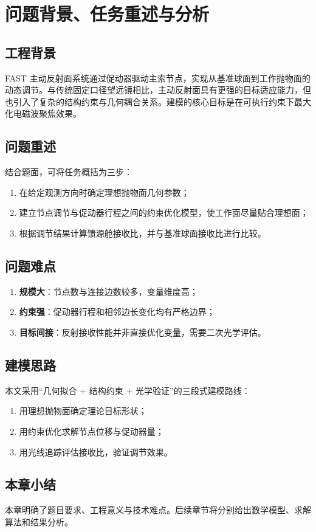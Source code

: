 \chapter{问题背景、任务重述与分析}

\section{工程背景}
FAST 主动反射面系统通过促动器驱动主索节点，实现从基准球面到工作抛物面的动态调节。与传统固定口径望远镜相比，主动反射面具有更强的目标适应能力，但也引入了复杂的结构约束与几何耦合关系。建模的核心目标是在可执行约束下最大化电磁波聚焦效果。

\section{问题重述}
结合题面，可将任务概括为三步：
\begin{enumerate}
  \item 在给定观测方向时确定理想抛物面几何参数；
  \item 建立节点调节与促动器行程之间的约束优化模型，使工作面尽量贴合理想面；
  \item 根据调节结果计算馈源舱接收比，并与基准球面接收比进行比较。
\end{enumerate}

\section{问题难点}
\begin{enumerate}
  \item \textbf{规模大}：节点数与连接边数较多，变量维度高；
  \item \textbf{约束强}：促动器行程和相邻边长变化均有严格边界；
  \item \textbf{目标间接}：反射接收性能并非直接优化变量，需要二次光学评估。
\end{enumerate}

\section{建模思路}
本文采用“几何拟合 + 结构约束 + 光学验证”的三段式建模路线：
\begin{enumerate}
  \item 用理想抛物面确定理论目标形状；
  \item 用约束优化求解节点位移与促动器量；
  \item 用光线追踪评估接收比，验证调节效果。
\end{enumerate}

\section{本章小结}
本章明确了题目要求、工程意义与技术难点。后续章节将分别给出数学模型、求解算法和结果分析。
